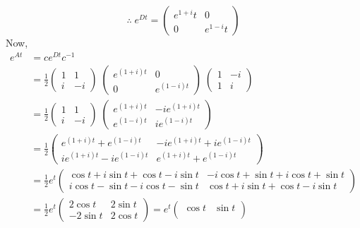 \documentclass[../main-sheet.tex]{subfiles}
\begin{document}
\begin{soln}
    \[\therefore\; e^{Dt}=\begin{pmatrix}
        e^{1+i}t & 0\\
        0 & e^{1-i}t
    \end{pmatrix}\]
    Now,
    \begin{align*}
        e^{At}&=ce^{Dt}c^{-1}\\
        &=\frac{1}{2}\begin{pmatrix}
            1 & 1\\
            i & -i
        \end{pmatrix}\;\begin{pmatrix}
            e^{(1+i)t} & 0\\
            0 & e^{(1-i)t}
        \end{pmatrix}\;\begin{pmatrix}
            1 & -i\\
            1 & i
        \end{pmatrix}\\
        &=\frac{1}{2}\begin{pmatrix}
            1 & 1\\
            i & -i
        \end{pmatrix}\;\begin{pmatrix}
            e^{(1+i)t} & -ie^{(1+i)t}\\
            e^{(1-i)t} & ie^{(1-i)t}
        \end{pmatrix}\\
        &=\frac{1}{2}\begin{pmatrix}
            e^{(1+i)t}+e^{(1-i)t} & -ie^{(1+i)t}+ie^{(1-i)t}\\
            ie^{(1+i)t}-ie^{(1-i)t} & e^{(1+i)t}+e^{(1-i)t}
        \end{pmatrix}\\
        &=\frac{1}{2}e^t\begin{pmatrix}
            \cos t+i\sin t+\cos t-i\sin t & -i\cos t+\sin t+i\cos t+\sin t\\
            i\cos t-\sin t-i\cos t-\sin t & \cos t+i\sin t+\cos t-i\sin t
        \end{pmatrix}\\
        &=\frac{1}{2}e^t\begin{pmatrix}
            2\cos t & 2\sin t\\
            -2\sin t & 2\cos t
        \end{pmatrix}=e^t\begin{pmatrix}
            \cos t & \sin t\\

\end{pmatrix}
\end{align*}
\end{soln}
\end{document}
